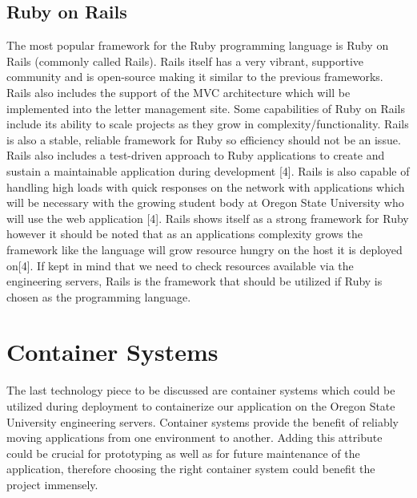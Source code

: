 \documentclass[onecolumn, draftclsnofoot,10pt, compsoc]{IEEEtran}
\begin{document}
\subsection{Ruby on Rails}
The most popular framework for the Ruby programming language is Ruby on Rails (commonly called Rails). Rails itself has a very vibrant, supportive community and is open-source making it similar to the previous frameworks. Rails also includes the support of the MVC architecture which will be implemented into the letter management site. Some capabilities of Ruby on Rails include its ability to scale projects as they grow in complexity/functionality. Rails is also a stable, reliable framework for Ruby so efficiency should not be an issue. Rails also includes a test-driven approach to Ruby applications to create and sustain a maintainable application during development [4]. Rails is also capable of handling high loads with quick responses on the network with applications which will be necessary with the growing student body at Oregon State University who will use the web application [4]. Rails shows itself as a strong framework for Ruby however it should be noted that as an applications complexity grows the framework like the language will grow resource hungry on the host it is deployed on[4]. If kept in mind that we need to check resources available via the engineering servers, Rails is the framework that should be utilized if Ruby is chosen as the programming language. 

\section{Container Systems}
The last technology piece to be discussed are container systems which could be utilized during deployment to containerize our application on the Oregon State University engineering servers. Container systems provide the benefit of reliably moving applications from one environment to another. Adding this attribute could be crucial for prototyping as well as for future maintenance of the application, therefore choosing the right container system could benefit the project immensely. 
\end{document}
